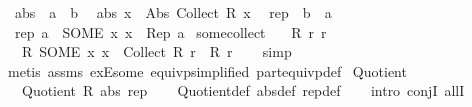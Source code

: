 \begin{isabellebody}
\isanewline
\isanewline
{}\isamarkupfalse%
\isanewline
\ \ abs\ {\isacharcolon}{\kern0pt}{\isacharcolon}{\kern0pt}\ {\isachardoublequoteopen}{\isacharprime}{\kern0pt}a\ {\isasymRightarrow}\ {\isacharprime}{\kern0pt}b{\isachardoublequoteclose}\isanewline
{}\isanewline
\ \ {\isachardoublequoteopen}abs\ x\ {\isacharequal}{\kern0pt}\ Abs\ {\isacharparenleft}{\kern0pt}Collect\ {\isacharparenleft}{\kern0pt}R\ x{\isacharparenright}{\kern0pt}{\isacharparenright}{\kern0pt}{\isachardoublequoteclose}\isanewline
\isanewline
{}\isamarkupfalse%
\isanewline
\ \ rep\ {\isacharcolon}{\kern0pt}{\isacharcolon}{\kern0pt}\ {\isachardoublequoteopen}{\isacharprime}{\kern0pt}b\ {\isasymRightarrow}\ {\isacharprime}{\kern0pt}a{\isachardoublequoteclose}\isanewline
{}\isanewline
\ \ {\isachardoublequoteopen}rep\ a\ {\isacharequal}{\kern0pt}\ {\isacharparenleft}{\kern0pt}SOME\ x{\isachardot}{\kern0pt}\ x\ {\isasymin}\ Rep\ a{\isacharparenright}{\kern0pt}{\isachardoublequoteclose}\isanewline
\isanewline
{}\isamarkupfalse%
\ some{\isacharunderscore}{\kern0pt}collect{\isacharcolon}{\kern0pt}\isanewline
\ \ \ {\isachardoublequoteopen}R\ r\ r{\isachardoublequoteclose}\isanewline
\ \ \ {\isachardoublequoteopen}R\ {\isacharparenleft}{\kern0pt}SOME\ x{\isachardot}{\kern0pt}\ x\ {\isasymin}\ Collect\ {\isacharparenleft}{\kern0pt}R\ r{\isacharparenright}{\kern0pt}{\isacharparenright}{\kern0pt}\ {\isacharequal}{\kern0pt}\ R\ r{\isachardoublequoteclose}\isanewline
%
\isadelimproof
\ \ %
\endisadelimproof
%
\isatagproof
{}\isamarkupfalse%
\ simp\isanewline
\ \ \isamarkupfalse%
\ {\isacharparenleft}{\kern0pt}metis\ assms\ exE{\isacharunderscore}{\kern0pt}some\ equivp{\isacharbrackleft}{\kern0pt}simplified\ part{\isacharunderscore}{\kern0pt}equivp{\isacharunderscore}{\kern0pt}def{\isacharbrackright}{\kern0pt}{\isacharparenright}{\kern0pt}%
\endisatagproof
{\isafoldproof}%
%
\isadelimproof
\isanewline
%
\endisadelimproof
\isanewline
{}\isamarkupfalse%
\ Quotient{\isacharcolon}{\kern0pt}\isanewline
\ \ \ {\isachardoublequoteopen}Quotient{}\ R\ abs\ rep{\isachardoublequoteclose}\isanewline
%
\isadelimproof
\ \ %
\endisadelimproof
%
\isatagproof
{}\isamarkupfalse%
\ Quotient{}{\isacharunderscore}{\kern0pt}def\ abs{\isacharunderscore}{\kern0pt}def\ rep{\isacharunderscore}{\kern0pt}def\isanewline
\ \ \isamarkupfalse%
\ {\isacharparenleft}{\kern0pt}intro\ conjI\ allI{\isacharparenright}{\kern0pt}\isanewline

\end{isabellebody}
